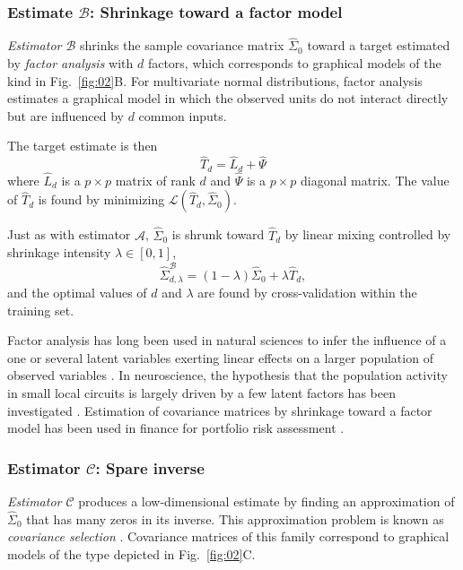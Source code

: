 \documentclass[10pt]{article}
\newcommand{\loss}[1]{\mathcal L\left(#1\right)}
\begin{document}
\subsubsection*{Estimate $\mathcal B$: Shrinkage toward a factor model}
\emph{Estimator $\mathcal B$} shrinks the sample covariance matrix $\hat\Sigma_0$ toward a target estimated by \emph{factor analysis} with $d$ factors, which corresponds to graphical models of the kind in Fig.~\ref{fig:02}B. For multivariate normal distributions, factor analysis estimates a graphical model in which the observed units do not interact directly but are influenced by $d$ common inputs.

The target estimate is then 
\begin{equation}
\hat T_d = \hat L_d + \hat \Psi
\end{equation}
where $\hat L_d$ is a $p\times p$ matrix of rank $d$ and $\hat \Psi$ is a $p\times p$ diagonal matrix. The value of $\hat T_d$ is found by minimizing $\loss{\hat T_d, \hat\Sigma_0}$. 

Just as with estimator $\mathcal A$, $\hat\Sigma_0$ is shrunk toward $\hat T_d$ by linear mixing controlled by shrinkage intensity $\lambda\in[0,1]$,
\begin{equation}
\hat\Sigma_{d,\lambda}^\mathcal{B} = (1-\lambda)\hat\Sigma_0 + \lambda\hat T_d,
\end{equation}
and the optimal values of $d$ and $\lambda$ are found by cross-validation within the training set.

Factor analysis has long been used in natural sciences to infer the influence of a one or several latent variables exerting linear effects on a larger population of observed variables \cite{Jvreskog:1996}.  In neuroscience, the hypothesis that the population activity in small local circuits is largely driven by a few latent factors has been investigated \cite{Yu:2009,Ecker:2013}.  Estimation of covariance matrices by shrinkage toward a factor model has been used in finance for portfolio risk assessment \cite{Ledoit:2003,Fan:2008}.

\subsubsection*{Estimator $\mathcal C$: Spare inverse}
\emph{Estimator $\mathcal C$} produces a low-dimensional estimate by finding an approximation of $\hat\Sigma_0$ that has many zeros in its inverse. This approximation problem is known as \emph{covariance selection} \cite{Dempster:1972}.  Covariance matrices of this family correspond to graphical models of the type depicted in Fig.~\ref{fig:02}C.
\end{document}
